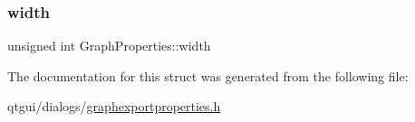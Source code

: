 \subsubsection{\texorpdfstring{width}{width}}
{\footnotesize\ttfamily unsigned int Graph\+Properties\+::width}



The documentation for this struct was generated from the following file\+:\begin{DoxyCompactItemize}
\item 
qtgui/dialogs/\mbox{\hyperlink{graphexportproperties_8h}{graphexportproperties.\+h}}\end{DoxyCompactItemize}
